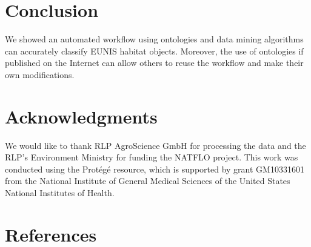 \documentclass[authoryear, review,12pt,number]{elsarticle}
\begin{document}
\section{Conclusion} We showed an automated
workflow using ontologies and data mining algorithms can accurately classify
EUNIS habitat objects. Moreover, the use of ontologies if published on the
Internet can allow others to reuse the workflow and make their own
modifications. 
\section{Acknowledgments}
We would like to thank RLP AgroScience GmbH for processing the data and the
RLP's Environment Ministry for funding the  NATFLO project. This work was
conducted using the Prot\'eg\'e resource, which is supported by grant GM10331601
from the National Institute of General Medical Sciences of the United States
National
Institutes of Health.

\section{References}  
\end{document}
